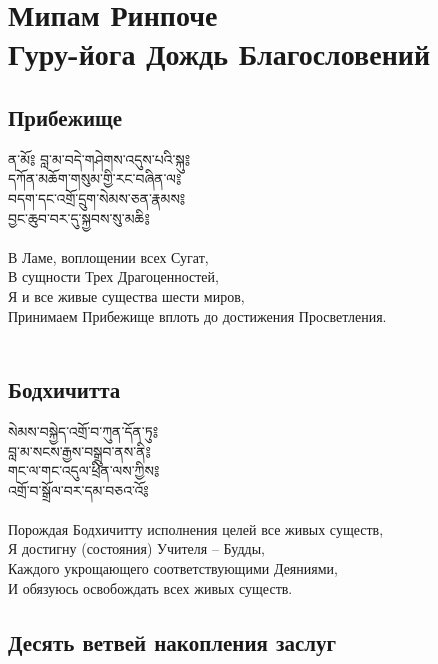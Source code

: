 \section{Мипам Ринпоче\\Гуру-йога Дождь Благословений}

\subsection{Прибежище}

\ti
ན་མོ༔ བླ་མ་བདེ་གཤེགས་འདུས་པའི་སྐུ༔\\
དཀོན་མཆོག་གསུམ་གྱི་རང་བཞིན་ལ༔\\
བདག་དང་འགྲོ་དྲུག་སེམས་ཅན་རྣམས༔\\
བྱང་ཆུབ་བར་དུ་སྐྱབས་སུ་མཆི༔\\
\\
\ru
В Ламе, воплощении всех Сугат,\\
В сущности Трех Драгоценностей,\\
Я и все живые существа шести миров,\\
Принимаем Прибежище вплоть до достижения Просветления.\\
\\


\subsection{Бодхичитта}

\ti
སེམས་བསྐྱེད་འགྲོ་བ་ཀུན་དོན་ཏུ༔\\
བླ་མ་སངས་རྒྱས་བསྒྲུབ་ནས་ནི༔\\
གང་ལ་གང་འདུལ་ཕྲིན་ལས་ཀྱིས༔\\
འགྲོ་བ་སྒྲོལ་བར་དམ་བཅའ་འོ༔\\
\\
\ru
Порождая Бодхичитту исполнения целей все живых существ,\\
Я достигну (состояния) Учителя – Будды,\\
Каждого укрощающего соответствующими Деяниями,\\
И обязуюсь освобождать всех живых существ.\\

\newpage
\subsection{Десять ветвей накопления заслуг}


